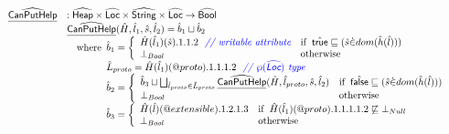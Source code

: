 \documentclass{article}
\makeatletter
\newcommand{\SF}[1]{\mbox{\textsf{#1}}}
\newcommand{\wherec}[1]{{\rm where}\begin{array}[t]{l}#1\end{array}}
\newcommand{\ifc}[1]{{\rm if}\begin{array}[t]{l}#1\end{array}}
\newcommand{\owc}{{\rm otherwise}}
\newcommand{\abs}[1]{\widehat{\SF{#1}}}
\newcommand{\aHeap}{\abs{Heap}}
\newcommand{\aLoc}{\abs{Loc}}
\newcommand{\powerset}[1]{\wp(#1)}
\newcommand{\ahf}[1]{\widehat{\underline{\sf #1}}}
\newcommand{\varprop}[1]{@#1}
\newcommand{\atrue}{\hat{\SF{true}}}
\newcommand{\afalse}{\hat{\SF{false}}}
\def\inblue{\color{blue}}
\makeatother
\begin{document}
\[\begin{array}{ll}
\ahf{CanPutHelp} &  : \aHeap \times \aLoc \times \abs{String} \times \aLoc \rightarrow \abs{Bool}\\
&  \ahf{CanPutHelp}(\hat{H},\hat{l}_1,\hat{s},\hat{l}_2)  = \hat{b}_1\sqcup\hat{b}_2\\
&  \quad\wherec{
    \hat{b}_1 =
    \left\{
      \begin{array}{ll}
        \hat{H}(\hat{l}_1)(\hat{s}).1.1.2
        ~~{\inblue \textit{// writable attribute}}
        & \ifc{\atrue\sqsubseteq(\hat{s} \dot{\in} dom(\hat{h}(\hat{l})))}\\
        \bot_{Bool} & \owc\\
      \end{array}
    \right.\\
    \hat{L}_{proto}=\hat{H}(\hat{l}_1)(\varprop{proto}).1.1.1.2
~~{\inblue \textit{// $\powerset{\aLoc}$ type}}\\
    \hat{b}_2 =
    \left\{
      \begin{array}{ll}
        \hat{b}_3 \sqcup \bigsqcup_{\hat{l}_{proto}\in\hat{L}_{proto}}\ahf{CanPutHelp}(\hat{H},\hat{l}_{proto},\hat{s},\hat{l}_2)& \ifc{\afalse\sqsubseteq(\hat{s} \dot{\in} dom(\hat{h}(\hat{l})))}\\
        \bot_{Bool} & \owc\\
      \end{array}
    \right.\\
    \hat{b}_3 =
    \left\{
      \begin{array}{ll}
        \hat{H}(\hat{l})(\varprop{extensible}).1.2.1.3& \ifc{\hat{H}(\hat{l}_1)(\varprop{proto}).1.1.1.1.2 \not\sqsubseteq \bot_{Null}}\\
        \bot_{Bool} & \owc\\
      \end{array}
    \right.\\
    }\\
\\


\end{array}\]
\end{document}
